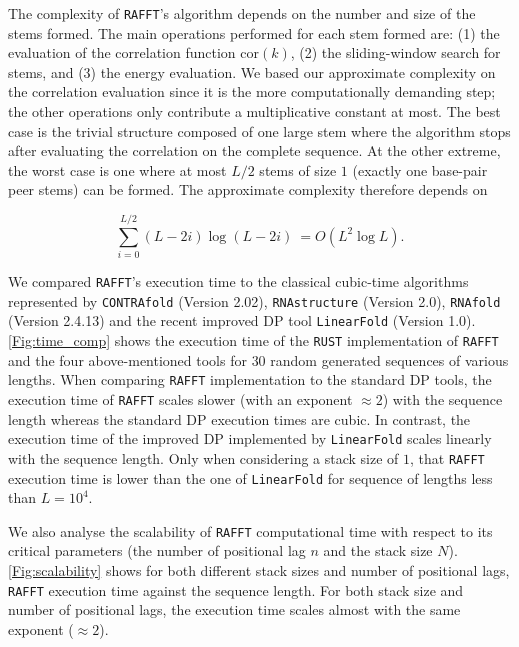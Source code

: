 The complexity of \texttt{RAFFT}'s algorithm depends on the number and size of the stems formed. The main operations performed for each stem formed are: (1) the evaluation of the correlation function \(\text{cor}(k)\), (2) the sliding-window search for stems, and (3) the energy evaluation. We based our approximate complexity on the correlation evaluation since it is the more computationally demanding step; the other operations only contribute a multiplicative constant at most. The best case is the trivial structure composed of one large stem where the algorithm stops after evaluating the correlation on the complete sequence. At the other extreme, the worst case is one where at most \(L/2\) stems of size $1$ (exactly one base-pair peer stems) can be formed. The approximate complexity therefore depends on 

\begin{equation}
\label{Eq:complexity}
\sum_{i=0}^{L/2} (L-2i) \log(L-2i) \ = O(L^2\log{L}).
\end{equation}

We compared \texttt{RAFFT}'s execution time to the classical cubic-time algorithms represented by \texttt{CONTRAfold} (Version 2.02), \texttt{RNAstructure} (Version 2.0), \texttt{RNAfold} (Version 2.4.13) and the recent improved \ac{DP} tool \texttt{LinearFold} (Version 1.0). \autoref{Fig:time_comp} shows the execution time of the \texttt{RUST} implementation of \texttt{RAFFT} and the four above-mentioned tools for $30$ random generated sequences of various lengths.  When comparing \texttt{RAFFT} implementation to the standard \ac{DP} tools, the execution time of \texttt{RAFFT} scales slower (with an exponent $\approx 2$) with the sequence length whereas the standard \ac{DP} execution times are cubic. In contrast, the execution time of the improved \ac{DP} implemented by \texttt{LinearFold} scales linearly with the sequence length. Only when considering a stack size of $1$, that \texttt{RAFFT} execution time is lower than the one of \texttt{LinearFold} for sequence of lengths less than $L=10^4$.

We also analyse the scalability of \texttt{RAFFT} computational time with respect to its critical parameters (the number  of positional lag $n$ and the stack size $N$). \autoref{Fig:scalability} shows for both different stack sizes and number of positional lags, \texttt{RAFFT} execution time against the sequence length. For both stack size and number of positional lags, the execution time scales almost with the same exponent ($\approx 2$).

